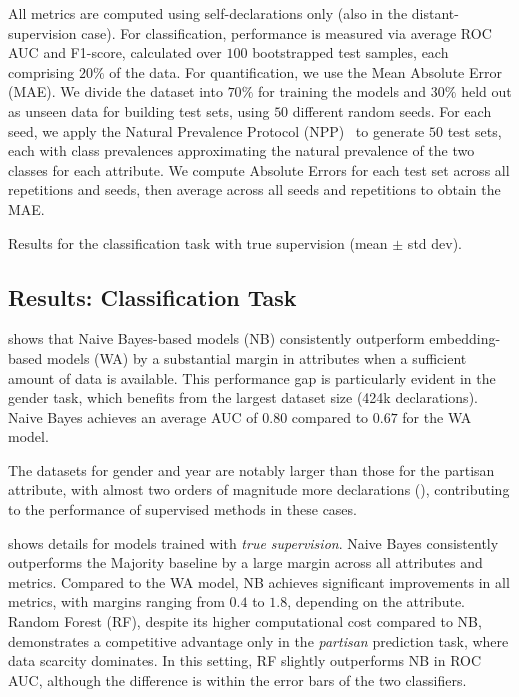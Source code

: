 All metrics are computed using self-declarations only (also in the distant-supervision case).
For classification, performance is measured via average ROC AUC and F1-score, calculated over $100$ bootstrapped test samples, each comprising $20\%$ of the data.
For quantification, we use the Mean Absolute Error (MAE).
We divide the dataset into $70\%$ for training the models and $30\%$ held out as unseen data for building test sets, using $50$ different random seeds.
For each seed, we apply the Natural Prevalence Protocol (NPP)~\cite{moreo2021quapy} to generate $50$ test sets, each with class prevalences approximating the natural prevalence of the two classes for each attribute.
We compute Absolute Errors for each test set across all repetitions and seeds, then average across all seeds and repetitions to obtain the MAE.

\begin{table}[t]
\caption{Results for the classification task with true supervision (mean $\pm$ std dev).}
\centering
\resizebox{\columnwidth}{!}{}
\label{table:classif}
\end{table}

\subsection{Results: Classification Task}

 shows that Naive Bayes-based models (NB) consistently outperform embedding-based models (WA) by a substantial margin in attributes when a sufficient amount of data is available.
This performance gap is particularly evident in the gender task, which benefits from the largest dataset size (424k declarations).
Naive Bayes achieves an average AUC of $0.80$ compared to $0.67$ for the WA model.

The datasets for gender and year are notably larger than those for the partisan attribute, with almost two orders of magnitude more declarations (), contributing to the performance of supervised methods in these cases.

 shows details for models trained with \emph{true supervision}.
Naive Bayes consistently outperforms the Majority baseline by a large margin across all attributes and metrics.
Compared to the WA model, NB achieves significant improvements in all metrics, with margins ranging from $0.4$ to $1.8$, depending on the attribute.
Random Forest (RF), despite its higher computational cost compared to NB, demonstrates a competitive advantage only in the \textit{partisan} prediction task, where data scarcity dominates.
In this setting, RF slightly outperforms NB in ROC AUC, although the difference is within the error bars of the two classifiers.


